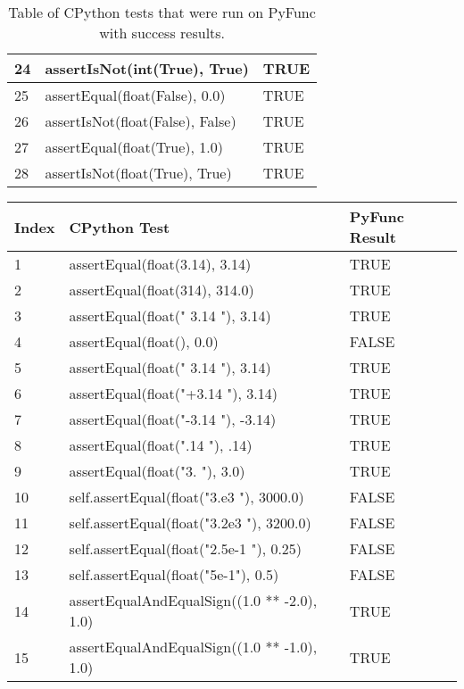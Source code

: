 \documentclass{l4proj}
\begin{document}
\begin{table}[!ht]
\begin{tabular}{|l|l|l|}
        24 & assertIsNot(int(True), True)  & TRUE \\ \hline
        25 & assertEqual(float(False), 0.0)  & TRUE \\ \hline
        26 & assertIsNot(float(False), False)  & TRUE \\ \hline
        27 & assertEqual(float(True), 1.0)  & TRUE \\ \hline
        28 & assertIsNot(float(True), True) & TRUE \\ \hline
    \end{tabular}
    \caption{Table of CPython tests that were run on PyFunc with success results.}
    \label{tbl:eval-bools}
\end{table}

\begin{table}[H]
    \centering
    \begin{tabular}{|l|l|l|}
    \hline
        Index & CPython Test  & PyFunc Result \\ \hline
        1 & assertEqual(float(3.14), 3.14)  & TRUE \\ \hline
        2 & assertEqual(float(314), 314.0) & TRUE \\ \hline
        3 & assertEqual(float("  3.14  "), 3.14)  & TRUE \\ \hline
        4 & assertEqual(float(), 0.0) & FALSE \\ \hline
        5 & assertEqual(float("  3.14  "), 3.14)  & TRUE \\ \hline
        6 & assertEqual(float("+3.14  "), 3.14)  & TRUE \\ \hline
        7 & assertEqual(float("-3.14  "), -3.14)  & TRUE \\ \hline
        8 & assertEqual(float(".14  "), .14)  & TRUE \\ \hline
        9 & assertEqual(float("3.  "), 3.0)  & TRUE \\ \hline
        10 & self.assertEqual(float("3.e3  "), 3000.0)  & FALSE \\ \hline
        11 & self.assertEqual(float("3.2e3  "), 3200.0)  & FALSE \\ \hline
        12 & self.assertEqual(float("2.5e-1  "), 0.25)  & FALSE \\ \hline
        13 & self.assertEqual(float("5e-1"), 0.5) & FALSE \\ \hline
        14 & assertEqualAndEqualSign((1.0 ** -2.0), 1.0)  & TRUE \\ \hline
        15 & assertEqualAndEqualSign((1.0 ** -1.0), 1.0)  & TRUE \\ \hline

\end{tabular}
\end{table}
\end{document}
